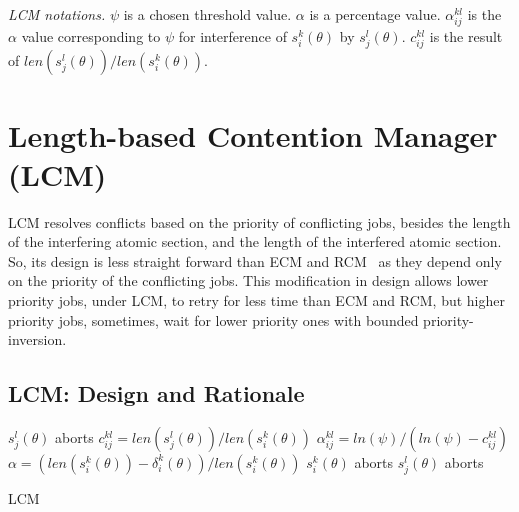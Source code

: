 \documentclass[conference]{IEEEtran}
\begin{document}
\textit{LCM notations.} $\psi$ is a chosen threshold value. $\alpha$ is a percentage value. $\alpha_{ij}^{kl}$ is the $\alpha$ value corresponding to $\psi$ for interference of $s_i^k(\theta)$ by $s_j^l(\theta)$. $c_{ij}^{kl}$ is the result of $len(s_j^l(\theta))/len(s_i^k(\theta))$.

\section{Length-based Contention Manager (LCM)}

LCM resolves conflicts based on the priority of conflicting jobs, besides the length of the interfering atomic section, and the length of the interfered atomic section. So, its design is less straight forward than ECM and RCM~\cite{stmconcurrencycontrol:emsoft11} as they depend only on the priority of the conflicting jobs. This modification in design allows lower priority jobs, under LCM, to retry for less time than ECM and RCM, but higher priority jobs, sometimes, wait for lower priority ones with bounded priority-inversion.

\subsection{\label{sec 9.1} LCM: Design and Rationale}

\begin{algorithm}
\LinesNumbered
{}
	{$s_j^l(\theta)$ aborts\label{step_sicommits}\;}
	{$c_{ij}^{kl}=len(s_j^l(\theta))/len(s_i^k(\theta))$\label{step_cijkl}\;
	$\alpha_{ij}^{kl}=ln(\psi)/(ln(\psi)-c_{ij}^{kl})$\label{step_alphaijkl}\;
	$\alpha=\left(len(s_i^k(\theta))-\delta_i^k(\theta)\right)/len(s_i^k(\theta))$\;
	{$s_i^k(\theta)$ aborts\label{step_siaborts}\;}
	{$s_j^l(\theta)$ aborts\label{step_sjaborts}\;}
	}
\caption{LCM}
\label{alg_lcm}
\end{algorithm}
\end{document}
